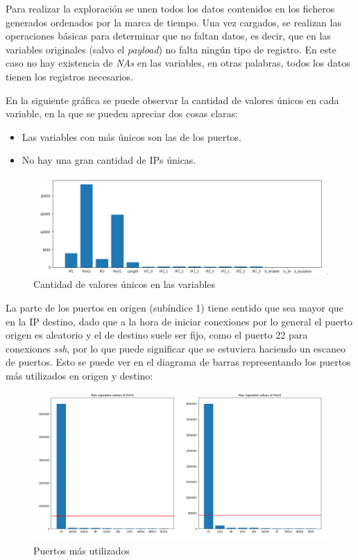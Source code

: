 Para realizar la exploración se unen todos los datos contenidos en los ficheros generados ordenados por la marca de tiempo. Una vez cargados, se realizan las operaciones básicas para determinar que no faltan datos, es decir, que en las variables originales (salvo el \textit{payload}) no falta ningún tipo de registro. En este caso no hay existencia de \textit{NAs} en las variables, en otras palabras, todos los datos tienen los registros necesarios.

En la siguiente gráfica se puede observar la cantidad de valores únicos en cada variable, en la que se pueden apreciar dos cosas claras:

\begin{itemize}
    \item Las variables con más únicos son las de los puertos.
    \item No hay una gran cantidad de IPs únicas.
\end{itemize}

\begin{figure}[H]
    \centering
    \includegraphics[width=17cm]{figs/unique_vals.PNG}
    \caption{Cantidad de valores únicos en las variables}
    \label{fig:uniquevals}
\end{figure}

La parte de los puertos en origen (subíndice 1) tiene sentido que sea mayor que en la IP destino, dado que a la hora de iniciar conexiones por lo general el puerto origen es aleatorio y el de destino suele ser fijo, como el puerto 22 para conexiones \textit{ssh}, por lo que puede significar que se estuviera haciendo un escaneo de puertos. Esto se puede ver en el diagrama de barras representando los puertos más utilizados en origen y destino:


\begin{figure}[H]
    \centering
    \includegraphics[width=17cm]{figs/ports.PNG}
    \caption{Puertos más utilizados}
    \label{fig:ports}
\end{figure}

